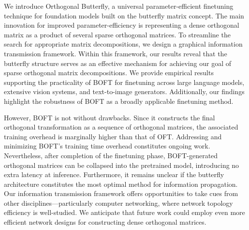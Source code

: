 We introduce Orthogonal Butterfly, a universal parameter-efficient finetuning technique for foundation models built on the butterfly matrix concept. The main innovation for improved parameter-efficiency is representing a dense orthogonal matrix as a product of several sparse orthogonal matrices. To streamline the search for appropriate matrix decompositions, we design a graphical information transmission framework. Within this framework, our results reveal that the butterfly structure serves as an effective mechanism for achieving our goal of sparse orthogonal matrix decompositions. We provide empirical results supporting the practicality of BOFT for finetuning across large language models, extensive vision systems, and text-to-image generators. Additionally, our findings highlight the robustness of BOFT as a broadly applicable finetuning method.

However, BOFT is not without drawbacks. Since it constructs the final orthogonal transformation as a sequence of orthogonal matrices, the associated training overhead is marginally higher than that of OFT. Addressing and minimizing BOFT's training time overhead constitutes ongoing work. Nevertheless, after completion of the finetuning phase, BOFT-generated orthogonal matrices can be collapsed into the pretrained model, introducing no extra latency at inference. Furthermore, it remains unclear if the butterfly architecture constitutes the most optimal method for information propagation. Our information transmission framework offers opportunities to take cues from other disciplines—particularly computer networking, where network topology efficiency is well-studied. We anticipate that future work could employ even more efficient network designs for constructing dense orthogonal matrices.